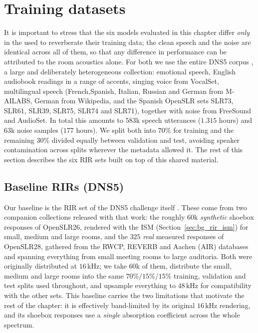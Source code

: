 \vspace{1cm}

\section{Training datasets}
\label{sec:mbrirs_datasets}

It is important to stress that the six models evaluated in this chapter differ \emph{only} in the  used to reverberate their training data; the clean speech and the noise are identical across all of them, so that any difference in performance can be attributed to the room acoustics alone. For both we use the entire \acrshort{DNS}5 corpus \citep{dns5}, a large and deliberately heterogeneous collection: emotional speech, English audiobook readings in a range of accents, singing voice from VocalSet, multilingual speech (French,Spanish, Italian, Russian and German from M-AILABS, German from Wikipedia, and the Spanish OpenSLR sets SLR73, SLR61, SLR39, SLR75, SLR74 and SLR71), together with noise from FreeSound and AudioSet.
In total this amounts to $583$k speech utterances ($1{.}315$ hours) and $63$k
noise samples ($177$ hours). We split both into $70\%$ for training and the
remaining $30\%$ divided equally between validation and test, avoiding
speaker contamination across splits wherever the metadata allowed it. The rest
of this section describes the six \acrshort{RIR} sets built on top of this
shared material.

\subsection{Baseline RIRs (DNS5)}
\label{ssec:mbrirs_dns5}


Our baseline is the \acrshort{RIR} set of the \acrshort{DNS}5 challenge itself
\citep{ko2017study}. These
 come from two companion collections released with that work:
the roughly $60$k \emph{synthetic} shoebox responses of OpenSLR26, rendered
with the \acrfull{ISM} (Section~\ref{sec:bg_rir_ism}) for small, medium and
large rooms, and the $325$ \emph{real} measured responses of OpenSLR28,
gathered from the RWCP, REVERB and Aachen (AIR) databases and spanning
everything from small meeting rooms to large auditoria. Both were originally
distributed at $16\,\text{kHz}$; we take $60$k of them, distribute the small,
medium and large rooms into the same $70\%/15\%/15\%$ training, validation and
test splits used throughout, and upsample everything to $48\,\text{kHz}$ for
compatibility with the other sets. This baseline carries the two limitations
that motivate the rest of the chapter: it is effectively band-limited by its
original $16\,\text{kHz}$ rendering, and its shoebox responses use a
\emph{single} absorption coefficient across the whole spectrum.

